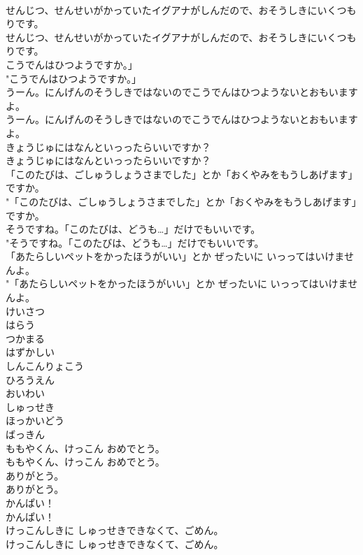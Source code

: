 \documentclass[8pt]{extreport}
\begin{document}
\begin{CJK}{UTF8}{min}
\\	せんじつ、せんせいがかっていたイグアナがしんだので、おそうしきにいくつもりです。	
\\	せんじつ、せんせいがかっていたイグアナがしんだので、おそうしきにいくつもりです。 
\\	こうでんはひつようですか。」	
\\	"こうでんはひつようですか。」 
\\	うーん。にんげんのそうしきではないのでこうでんはひつようないとおもいますよ。	
\\	うーん。にんげんのそうしきではないのでこうでんはひつようないとおもいますよ。 
\\	きょうじゅにはなんといっったらいいですか？	
\\	きょうじゅにはなんといっったらいいですか？ 
\\	「このたびは、ごしゅうしょうさまでした」とか「おくやみをもうしあげます」ですか。	
\\	"「このたびは、ごしゅうしょうさまでした」とか「おくやみをもうしあげます」ですか。 
\\	そうですね。「このたびは、どうも…」だけでもいいです。	
\\	"そうですね。「このたびは、どうも…」だけでもいいです。 
\\	「あたらしいペットをかったほうがいい」とか ぜったいに いっってはいけませんよ。	
\\	"「あたらしいペットをかったほうがいい」とか ぜったいに いっってはいけませんよ。 
\\	けいさつ
\\	はらう
\\	つかまる
\\	はずかしい
\\	しんこんりょこう
\\	ひろうえん
\\	おいわい
\\	しゅっせき
\\	ほっかいどう
\\	ばっきん
\\	ももやくん、けっこん おめでとう。	
\\	ももやくん、けっこん おめでとう。 
\\	ありがとう。	
\\	ありがとう。 
\\	かんぱい！	
\\	かんぱい！ 
\\	けっこんしきに しゅっせきできなくて、ごめん。	
\\	けっこんしきに しゅっせきできなくて、ごめん。 

\end{CJK}
\end{document}
